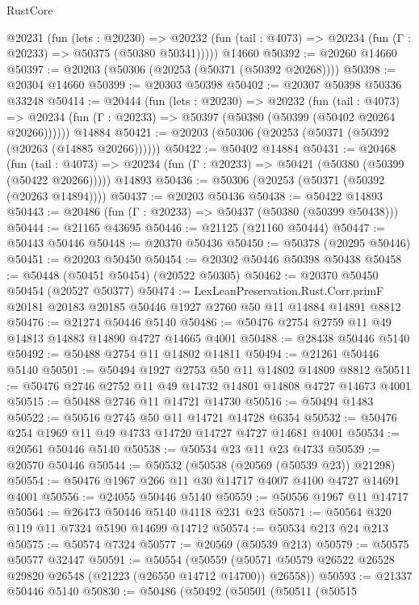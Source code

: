 \begin{lexlean}{RustCore}
\begin{coremodule}
    @20231
      (fun (lets : @20230) =>
      @20232 (fun (tail : @4073) => @20234 (fun (Γ : @20233) => @50375 (@50380 @50341)))))
    @14660
@50392 := @20260 @14660
@50397 := @20203 (@50306 (@20253 (@50371 (@50392 @20268))))
@50398 := @20304 @14660
@50399 := @20303 @50398
@50402 := @20307 @50398 @50336 @33248
@50414 := @20444
    (fun (lets : @20230) =>
    @20232
      (fun (tail : @4073) =>
      @20234 (fun (Γ : @20233) => @50397 (@50380 (@50399 (@50402 @20264 @20266))))))
    @14884
@50421 := @20203 (@50306 (@20253 (@50371 (@50392 (@20263 (@14885 @20266))))))
@50422 := @50402 @14884
@50431 := @20468
    (fun (tail : @4073) => @20234 (fun (Γ : @20233) => @50421 (@50380 (@50399 (@50422 @20266)))))
    @14893
@50436 := @50306 (@20253 (@50371 (@50392 (@20263 @14894))))
@50437 := @20203 @50436
@50438 := @50422 @14893
@50443 := @20486 (fun (Γ : @20233) => @50437 (@50380 (@50399 @50438)))
@50444 := @21165 @43695
@50446 := @21125 (@21160 @50444)
@50447 := @50443 @50446
@50448 := @20370 @50436
@50450 := @50378 (@20295 @50446)
@50451 := @20203 @50450
@50454 := @20302 @50446 @50398 @50438
@50458 := @50448 (@50451 @50454) (@20522 @50305)
@50462 := @20370 @50450 @50454 (@20527 @50377)
@50474 := LexLeanPreservation.Rust.Corr.primF
    @20181
    @20183
    @20185
    @50446
    @1927
    @2760
    @50
    @11
    @14884
    @14891
    @8812
@50476 := @21274 @50446 @5140
@50486 := @50476 @2754 @2759 @11 @49 @14813 @14883 @14890 @4727 @14665 @4001
@50488 := @28438 @50446 @5140
@50492 := @50488 @2754 @11 @14802 @14811
@50494 := @21261 @50446 @5140
@50501 := @50494 @1927 @2753 @50 @11 @14802 @14809 @8812
@50511 := @50476 @2746 @2752 @11 @49 @14732 @14801 @14808 @4727 @14673 @4001
@50515 := @50488 @2746 @11 @14721 @14730
@50516 := @50494 @1483
@50522 := @50516 @2745 @50 @11 @14721 @14728 @6354
@50532 := @50476 @254 @1969 @11 @49 @4733 @14720 @14727 @4727 @14681 @4001
@50534 := @20561 @50446 @5140
@50538 := @50534 @23 @11 @23 @4733
@50539 := @20570 @50446
@50544 := @50532 (@50538 (@20569 (@50539 @23)) @21298)
@50554 := @50476 @1967 @266 @11 @30 @14717 @4007 @4100 @4727 @14691 @4001
@50556 := @24055 @50446 @5140
@50559 := @50556 @1967 @11 @14717
@50564 := @26473 @50446 @5140 @4118 @231 @23
@50571 := @50564 @320 @119 @11 @7324 @5190 @14699 @14712
@50574 := @50534 @213 @24 @213
@50575 := @50574 @7324
@50577 := @20569 (@50539 @213)
@50579 := @50575 @50577 @32447
@50591 := @50554
    (@50559 (@50571 @50579 @26522 @26528 @29820 @26548 (@21223 (@26550 @14712 @14700)) @26558))
@50593 := @21337 @50446 @5140
@50830 := @50486
    (@50492
      (@50501
        (@50511
          (@50515

\end{coremodule}
\end{lexlean}
